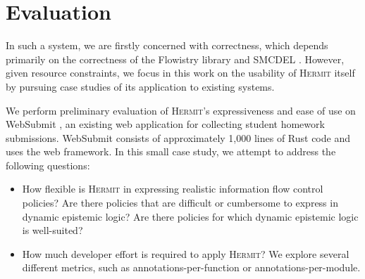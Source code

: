 \documentclass[letterpaper,twocolumn,10pt]{article}
\newcommand{\Hermit}{\textsc{Hermit}}
\begin{document}
\section{Evaluation}

In such a system, we are firstly concerned with correctness, which depends primarily on the
correctness of the Flowistry library \cite{crichton_2022a} and SMCDEL \cite{gattinger_2018a}.
However, given resource constraints, we focus in this work on the usability of \Hermit{} itself by
pursuing case studies of its application to existing systems.

We perform preliminary evaluation of \Hermit{}'s expressiveness and ease of use on WebSubmit
\cite{schwarzkopf_2022a}, an existing web application for collecting student homework submissions.
WebSubmit consists of approximately 1,000 lines of Rust code and uses the \cite{benitez_2024a} web
framework. In this small case study, we attempt to address the following questions:

\begin{itemize}
  \item How flexible is \Hermit{} in expressing realistic information flow control policies? Are
    there policies that are difficult or cumbersome to express in dynamic epistemic logic? Are there
    policies for which dynamic epistemic logic is well-suited?

  \item How much developer effort is required to apply \Hermit{}? We explore several different
    metrics, such as annotations-per-function or annotations-per-module.
\end{itemize}



\end{document}
